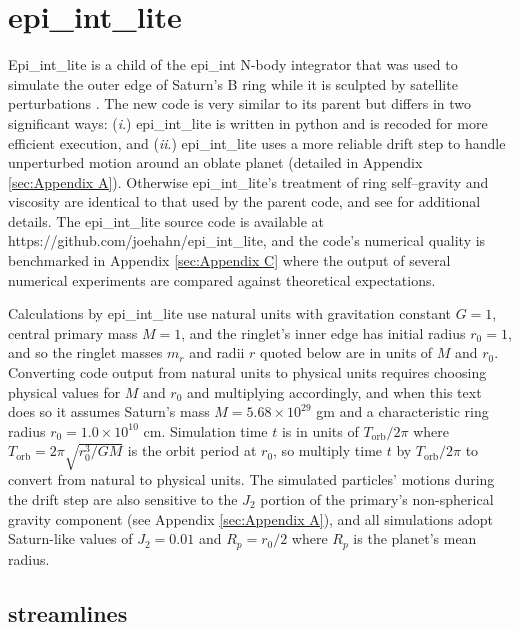 \documentclass[preprint]{aastex62}
\begin{document}
\section{epi\_int\_lite}
\label{sec:epi_int_lite}

Epi\_int\_lite is a child of the epi\_int N-body integrator that was used to
simulate the outer edge of Saturn's B ring while it is sculpted by satellite perturbations
\citep{HS13}. The new code is very similar to its parent but differs in two significant ways:
({\it i}.) epi\_int\_lite is written in python and is recoded for more efficient execution, and
({\it ii}.) epi\_int\_lite uses a more reliable drift step to handle
unperturbed motion around an oblate planet (detailed in Appendix \ref{sec:Appendix A}).
Otherwise epi\_int\_lite's treatment of ring self--gravity and viscosity are identical
to that used by the parent code, and see \cite{HS13} for additional details. The epi\_int\_lite 
source code is available at https://github.com/joehahn/epi\_int\_lite, and the
code's numerical quality is benchmarked in Appendix \ref{sec:Appendix C}
where the output of several numerical experiments are compared against theoretical expectations.

Calculations by epi\_int\_lite use natural units with gravitation constant $G=1$, 
central primary mass $M=1$, and the ringlet's inner edge has initial radius
$r_0=1$, and so the ringlet masses $m_r$ and radii $r$ quoted below are in units of $M$ and $r_0$.
Converting code output from natural units to physical units requires choosing	
physical values for $M$ and $r_0$ and multiplying accordingly, and when this text does so
it assumes Saturn's mass $M=5.68\times10^{29}$ gm and a characteristic
ring radius $r_0=1.0\times10^{10}$ cm. Simulation time $t$ is in units of $T_{\text{orb}}/2\pi$
where $T_{\text{orb}} = 2\pi\sqrt{r_0^3/GM}$ is the orbit period at $r_0$, 
so multiply time $t$ by $T_{\text{orb}}/2\pi$ 
to convert from natural to physical units.
The simulated particles' motions during the drift step are also
sensitive to the $J_2$ portion of the primary's non-spherical gravity component 
(see Appendix \ref{sec:Appendix A}), and all simulations
adopt Saturn-like values of $J_2=0.01$ and $R_p=r_0/2$ where $R_p$ is the planet's
mean radius.

\subsection{streamlines}
\label{subsec:streamlines}
\end{document}
